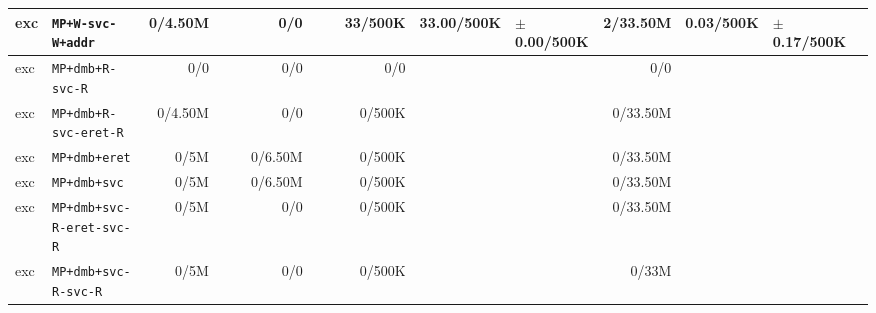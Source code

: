 \begin{tabular}{l l  | r r l | r r l | r r l | r r l l}
             exc &                                     \verb|MP+W-svc-W+addr| &        0/4.50M &                       &                   &            0/0 &                       &                 &        33/500K &            33.00/500K &   $\pm$ 0.00/500K &       2/33.50M &             0.03/500K &   $\pm$ 0.17/500K & \\ \hline 
             exc &                                      \verb|MP+dmb+R-svc-R| &            0/0 &                       &                   &            0/0 &                       &                 &            0/0 &                       &                   &            0/0 &                       &                   & \\ \hline 
             exc &                                 \verb|MP+dmb+R-svc-eret-R| &        0/4.50M &                       &                   &            0/0 &                       &                 &         0/500K &                       &                   &       0/33.50M &                       &                   & \\ \hline 
             exc &                                         \verb|MP+dmb+eret| &           0/5M &                       &                   &        0/6.50M &                       &                 &         0/500K &                       &                   &       0/33.50M &                       &                   & \\ \hline 
             exc &                                          \verb|MP+dmb+svc| &           0/5M &                       &                   &        0/6.50M &                       &                 &         0/500K &                       &                   &       0/33.50M &                       &                   & \\ \hline 
             exc &                             \verb|MP+dmb+svc-R-eret-svc-R| &           0/5M &                       &                   &            0/0 &                       &                 &         0/500K &                       &                   &       0/33.50M &                       &                   & \\ \hline 
             exc &                                  \verb|MP+dmb+svc-R-svc-R| &           0/5M &                       &                   &            0/0 &                       &                 &         0/500K &                       &                   &          0/33M &                       &                   & \\ \hline 

\end{tabular}
